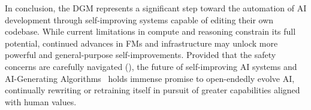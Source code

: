 In conclusion, the DGM represents a significant step toward the automation of AI development through self-improving systems capable of editing their own codebase. While current limitations in compute and reasoning constrain its full potential, continued advances in FMs and infrastructure may unlock more powerful and general-purpose self-improvements. Provided that the safety concerns are carefully navigated (), the future of self-improving AI systems and AI-Generating Algorithms~\citep{clune2019ai} holds immense promise to open-endedly evolve AI, continually rewriting or retraining itself in pursuit of greater capabilities aligned with human values.
